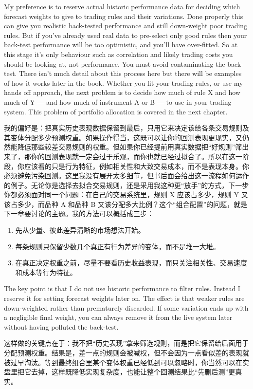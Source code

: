 
\begin{englishblock} My preference is to reserve actual historic performance data for deciding which forecast weights to give to trading rules and their variations. Done properly this can give you realistic back-tested performance and still down-weight poor trading rules. But if you've already used real data to pre-select only good rules then your back-test performance will be too optimistic, and you'll have over-fitted. So at this stage it's only behaviour such as correlation and likely trading costs you should be looking at, not performance. You must avoid contaminating the back-test. There isn't much detail about this process here but there will be examples of how it works later in the book. Whether you fit your trading rules, or use my hands off approach, the next problem is to decide how much of rule X and how much of Y --- and how much of instrument A or B --- to use in your trading system. This problem of portfolio allocation is covered in the next chapter. \end{englishblock}

\begin{chineseblock}我的偏好是：把真实历史表现数据保留到最后，只用它来决定该给各条交易规则及其变体分配多少预测权重。如果操作得当，这既可以让你的回测表现更现实，又仍然能降低那些较差交易规则的权重。但如果你已经提前用真实数据把“好规则”筛出来了，那你的回测表现就一定会过于乐观，而你也就已经过拟合了。所以在这一阶段，你应该看的只是行为特征，例如相关性和大致交易成本，而不是表现本身。你必须避免污染回测。这里我没有展开太多细节，但书后面会给出这一流程如何运作的例子。无论你是选择去拟合交易规则，还是采用我这种更“放手”的方式，下一步你都必须面对同一个问题：在自己的交易系统里，规则 X 应该占多少，规则 Y 又该占多少，而品种 A 和品种 B 又该分配多大比例？这个“组合配置”的问题，就是下一章要讨论的主题。我的方法可以概括成三步：\end{chineseblock}

\begin{enumerate}
\item 先从少量、彼此差异清晰的市场想法开始。
\item 每条规则只保留少数几个真正有行为差异的变体，而不是堆一大堆。
\item 在真正决定权重之前，尽量不要看历史收益表现，而只关注相关性、交易速度和成本等行为特征。\end{enumerate}

\begin{englishblock} The key point is that I do not use historic performance to filter rules. Instead I reserve it for setting forecast weights later on. The effect is that weaker rules are down-weighted rather than prematurely discarded. If some variation ends up with a negligible final weight, you can always remove it from the live system later without having polluted the back-test. \end{englishblock}

\begin{chineseblock}这样做的关键点在于：我不把“历史表现”拿来筛选规则，而是把它保留给后面用于分配预测权重。结果是，差一点的规则会被减权，但不会因为一点看似差的表现就被过早淘汰。等到最终组合里某个变体权重已经低到可以忽略时，你当然可以在实盘里把它去掉，这样既降低实现复杂度，也能让整个回测结果比“先删后测”更真实。\end{chineseblock}

